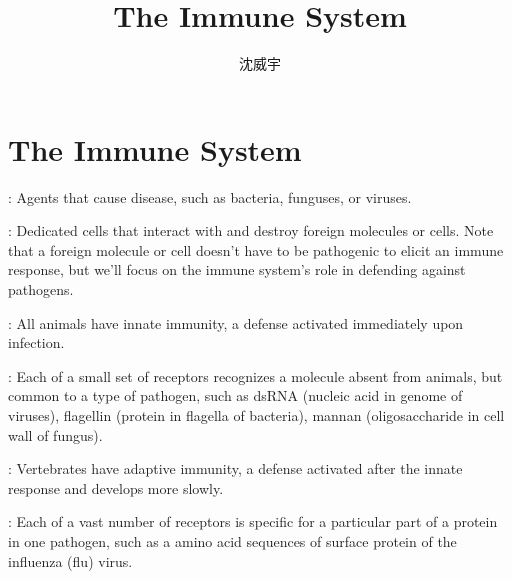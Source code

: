 \documentclass[a4paper,12pt]{article}
\begin{document}
\title{The Immune System}
\author{沈威宇}
\date{\temtoday}
\titletocdoc
\section{The Immune System}
\bit
\item{}: Agents that cause disease, such as bacteria, funguses, or viruses.
\item{}: Dedicated cells that interact with and destroy foreign molecules or cells. Note that a foreign molecule or cell doesn’t have to be pathogenic to elicit an immune response, but we’ll focus on the immune system’s role in defending against pathogens.
\item{}: All animals have innate immunity, a defense activated immediately upon infection.
\item{}: Each of a small set of receptors recognizes a molecule absent from animals, but common to a type of pathogen, such as dsRNA (nucleic acid in genome of viruses), flagellin (protein in flagella of bacteria), mannan (oligosaccharide in cell wall of fungus).
\item{}: Vertebrates have adaptive immunity, a defense activated after the innate response and develops more slowly.
\item{}: Each of a vast number of receptors is specific for a particular part of a protein in one pathogen, such as a amino acid sequences of surface protein of the influenza (flu) virus.
\eit
{}
\end{document}
